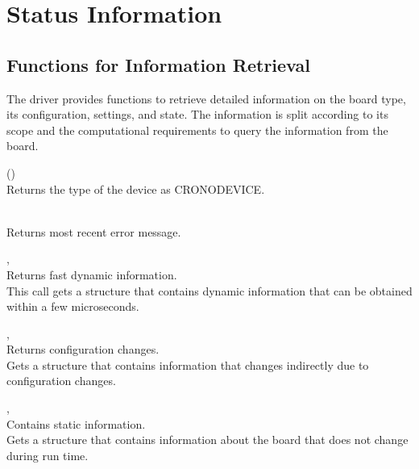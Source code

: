 \section{Status Information}
	

\subsection{Functions for Information Retrieval}
    The driver provides functions to retrieve detailed information on the board type, its configuration, settings, and state. 
    The information is split according to its scope and the computational requirements to query the information from the board.
    

    (\device{})\\
    Returns the type of the device as \textsf{CRONO\tu DEVICE\tu {}}.\par

    \\
    Returns most recent error message.
    \par

    \deviceindex, \\
    Returns fast dynamic information.\\
    This call gets a structure that contains dynamic information that can be obtained within a few microseconds.\par

    \deviceindex, \\
    Returns configuration changes.\\
    Gets a structure that contains information that changes indirectly due to configuration changes.\par


    \deviceindex, \\
    Contains static information.\\
    Gets a structure that contains information about the board that does not change during run time.\par 

